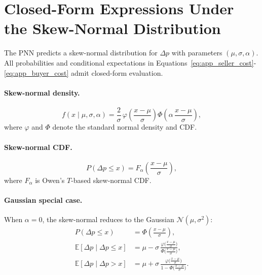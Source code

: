 \documentclass[11pt]{report}
\begin{document}
\section{Closed-Form Expressions Under the Skew-Normal Distribution}\label{app:spoofing:closedform}

The PNN predicts a skew-normal distribution for $\Delta p$ with parameters $(\mu, \sigma, \alpha)$. All probabilities and conditional expectations in Equations~\eqref{eq:app_seller_cost}-\eqref{eq:app_buyer_cost} admit closed-form evaluation.

\paragraph{Skew-normal density.}
\begin{equation}
  f(x \mid \mu, \sigma, \alpha) = \frac{2}{\sigma}\,\varphi\!\left(\frac{x - \mu}{\sigma}\right)\Phi\!\left(\alpha\,\frac{x - \mu}{\sigma}\right),
  \label{eq:app_sn_pdf}
\end{equation}
where $\varphi$ and $\Phi$ denote the standard normal density and CDF.

\paragraph{Skew-normal CDF.}
\begin{equation}
  P(\Delta p \leq x) = F_\alpha\!\left(\frac{x - \mu}{\sigma}\right),
  \label{eq:app_sn_cdf}
\end{equation}
where $F_\alpha$ is Owen's $T$-based skew-normal CDF.

\paragraph{Gaussian special case.}
When $\alpha = 0$, the skew-normal reduces to the Gaussian $\mathcal{N}(\mu, \sigma^2)$:
\begin{align}
  P(\Delta p \leq x) &= \Phi\!\left(\frac{x - \mu}{\sigma}\right), \label{eq:app_gauss_cdf} \\[4pt]
  \mathbb{E}[\Delta p \mid \Delta p \leq x] &= \mu - \sigma\,\frac{\varphi\!\bigl(\frac{x - \mu}{\sigma}\bigr)}{\Phi\!\bigl(\frac{x - \mu}{\sigma}\bigr)}, \label{eq:app_gauss_lower} \\[4pt]
  \mathbb{E}[\Delta p \mid \Delta p > x] &= \mu + \sigma\,\frac{\varphi\!\bigl(\frac{x - \mu}{\sigma}\bigr)}{1 - \Phi\!\bigl(\frac{x - \mu}{\sigma}\bigr)}. \label{eq:app_gauss_upper}
\end{align}
\end{document}

